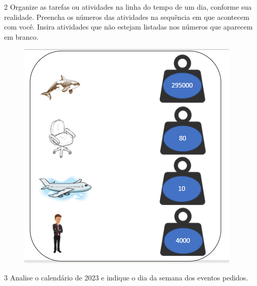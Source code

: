 \pagebreak
\num{2} Organize as tarefas ou atividades na linha do tempo de um dia, conforme
sua realidade. Preencha os números das atividades na sequência em que acontecem com você. Insira atividades que não estejam listadas nos números que aparecem em branco.

\begin{figure}[htpb!]
\includegraphics[width=\textwidth]{./media/image51.png}
\end{figure}


\pagebreak
\num{3} Analise o calendário de 2023 e indique o dia da semana dos eventos pedidos.


